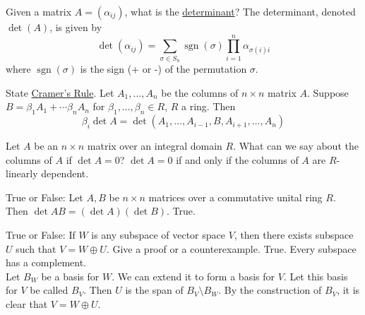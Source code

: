 \documentclass[avery5371,grid]{flashcards}
\DeclareMathOperator{\sgn}{sgn}
\begin{document}

\begin{flashcard}{Given a matrix $A = (\alpha_{ij})$, what is the \underline{determinant}?}
 The determinant, denoted $\det(A)$, is given by
 $$
 \det(\alpha_{ij}) = \sum_{\sigma \in S_n} \sgn(\sigma) \prod_{i=1}^n \alpha_{\sigma(i)i}
 $$
 where $\sgn(\sigma)$ is the sign (+ or -) of the permutation $\sigma$.
\end{flashcard}

\begin{flashcard}{State \underline{Cramer's Rule}.}
 Let $A_1, \ldots, A_n$ be the columns of $n \times n$ matrix $A$. Suppose $B = \beta_1 A_1 + \cdots \beta_n A_n$ for $\beta_1, \ldots, \beta_n \in R$, $R$ a ring. Then
 $$
 \beta_i \det A = \det(A_1, \ldots, A_{i-1}, B, A_{i+1}, \ldots, A_n)
 $$
\end{flashcard}

\begin{flashcard}{Let $A$ be an $n \times n$ matrix over an integral domain $R$. What can we say about the columns of $A$ if $\det A = 0$?}
 $\det A = 0$ if and only if the columns of $A$ are $R$-linearly dependent.
\end{flashcard}

\begin{flashcard}{True or False: Let $A,B$ be $n \times n$ matrices over a commutative unital ring $R$. Then $\det AB = (\det A) (\det B)$.}
 True.
\end{flashcard}

\begin{flashcard}{True or False: If $W$ is any subspace of vector space $V$, then there exists subspace $U$ such that $V = W \oplus U$. Give a proof or a counterexample.}
 True. Every subspace has a complement. \\
 
 Let $B_W$ be a basis for $W$. We can extend it to form a basis for $V$. Let this basis for $V$ be called $B_V$. Then $U$ is the span of $B_V \setminus B_W.$ By the construction of $B_V$, it is clear that $V = W \oplus U$. 
\end{flashcard}
\end{document}

